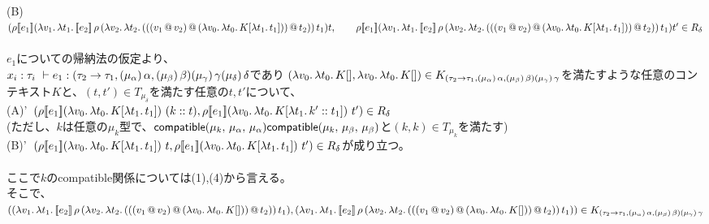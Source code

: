  \\
  (B)\ $(\rho \CPSTh{e_1}
      \LamP{v_1}{\Lam{t_1}{\CPS{e_2}{\rho}
            {\LamP{v_2}{\Lam{t_2}
                {\AppP{\AppP{\AppP{v_1}{v_2}}
                    {\LamP{v_0}{\Lam{t_0}
                        {K[\Lam{t_1}{t_1}]}}}}{t_2}}}}{t_1}}}{t},\\
      \qquad \rho \CPSTh{e_1}
      \LamP{v_1}{\Lam{t_1}{\CPS{e_2}{\rho}
            {\LamP{v_2}{\Lam{t_2}
                {\AppP{\AppP{\AppP{v_1}{v_2}}
                    {\LamP{v_0}{\Lam{t_0}
                        {K[\Lam{t_1}{t_1}]}}}}{t_2}}}}{t_1}}}{t'}\in R_{\delta}$\\
      \\
$e_1$についての帰納法の仮定より、\\
      $x_i:\tau_i\ \vdash e_1:(\tau_2\rightarrow{\tau_1},(\mu_{\alpha})\,\alpha,(\mu_{\beta})\,\beta) (\mu_{\gamma})\,\gamma (\mu_{\delta})\,\delta$であり
      $(\lambda{v_0}.\,{\lambda{t_0}.\,{K[]}}, \lambda{v_0}.\,{\lambda{t_0}.\,{K[]}})\in  K_{(\tau_2\rightarrow{\tau_1},(\mu_{\alpha})\,\alpha,(\mu_{\beta})\,\beta) (\mu_{\gamma})\,\gamma}$を満たすような任意のコンテキスト$K$と、$(t, t') \in T_{\mu_{\delta}}$を満たす任意の$t, t'$について、\\
  (A)'\ $(\rho [\![{e_1}]\!] (\lambda{v_0}.\,{\lambda{t_0}.\,{K[\lambda{t_1}.\,{t_1}]}})\ (k::t), \rho [\![{e_1}]\!] (\lambda{v_0}.\,{\lambda{t_0}.\,{K[\lambda{t_1}.\,{k'::t_1}]}})\ t')\in R_{\delta}$\\
      (ただし、$k$は任意の$\mu_k$型で、$\textsf{compatible}(\mu_k,\,\mu_{\alpha},\,\mu_{\alpha}) \textsf{compatible}(\mu_k,\,\mu_{\beta},\,\mu_{\beta})$と$(k,k)\in T_{\mu_k}$を満たす)\\
  (B)'\ $(\rho [\![{e_1}]\!] (\lambda{v_0}.\,{\lambda{t_0}.\,{K[\lambda{t_1}.\,{t_1}]}})\ t, \rho [\![{e_1}]\!] (\lambda{v_0}.\,{\lambda{t_0}.\,{K[\lambda{t_1}.\,{t_1}]}})\ t')\in R_{\delta}$が成り立つ。\\
      \\
ここで$k$の\textsf{compatible}関係については(1),(4)から言える。\\
そこで、\\
$((\lambda{v_1}.\,{\lambda{t_1}.\,{[\![{e_2}]\!]\,\rho\,(\lambda{v_2}.\,{\lambda{t_2}.\,{({({({v_1}\,@\,{v_2})}\,@\,{(\lambda{v_0}.\,{\lambda{t_0}.\,{K[]}})})}\,@\,{t_2})}})\,t_1}}),\\
 (\lambda{v_1}.\,{\lambda{t_1}.\,{[\![{e_2}]\!]\,\rho\,(\lambda{v_2}.\,{\lambda{t_2}.\,{({({({v_1}\,@\,{v_2})}\,@\,{(\lambda{v_0}.\,{\lambda{t_0}.\,{K[]}})})}\,@\,{t_2})}})\,t_1}}))\in K_{(\tau_2\rightarrow{\tau_1},(\mu_{\alpha})\,\alpha,(\mu_{\beta})\,\beta) (\mu_{\gamma})\,\gamma}$\\
